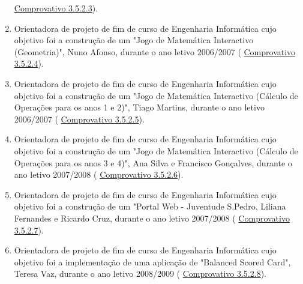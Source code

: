 \documentclass[11pt]{article}
\begin{document}
\begin{enumerate}
{\href{run:CoOrientTrabalhos/projFimCursoEI.pdf}{Comprovativo 3.5.2.3}).}
\item{Orientadora de projeto de fim de curso de Engenharia Informática cujo objetivo foi a construção de um "Jogo de Matemática Interactivo (Geometria)", Nuno Afonso, durante o ano letivo 2006/2007 (
\href{run:CoOrientTrabalhos/projFimCursoEI.pdf}{Comprovativo 3.5.2.4}).}
\item{Orientadora de projeto de fim de curso de Engenharia Informática cujo objetivo foi a construção de um "Jogo de Matemática Interactivo (Cálculo de Operações para os anos 1 e 2)", Tiago Martins, durante o ano letivo 2006/2007 (
\href{run:CoOrientTrabalhos/projFimCursoEI.pdf}{Comprovativo 3.5.2.5}).}
\item{Orientadora de projeto de fim de curso de Engenharia Informática cujo objetivo foi a construção de um "Jogo de Matemática Interactivo (Cálculo de Operações para os anos 3 e 4)", Ana Silva e Francisco Gonçalves, durante o ano letivo 2007/2008 (
\href{run:CoOrientTrabalhos/projFimCursoEI.pdf}{Comprovativo 3.5.2.6}).}
\item{Orientadora de projeto de fim de curso de Engenharia Informática cujo objetivo foi a construção de um "Portal Web - Juventude S.Pedro,  Liliana Fernandes e Ricardo Cruz, durante o ano letivo 2007/2008 (
\href{run:CoOrientTrabalhos/projFimCursoEI.pdf}{Comprovativo 3.5.2.7}).}
\item{Orientadora de projeto de fim de curso de Engenharia Informática cujo objetivo foi a implementação de uma aplicação de "Balanced Scored Card", Teresa Vaz, durante o ano letivo 2008/2009 (
\href{run:CoOrientTrabalhos/projFimCursoEI.pdf}{Comprovativo 3.5.2.8}).}
\end{enumerate}
\end{document}
